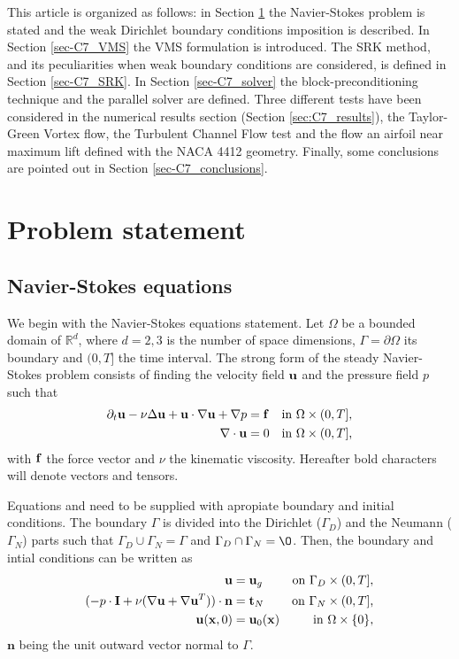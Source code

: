 This article is organized as follows: in Section \ref{sec:C7_prob_statment} the Navier-Stokes problem is stated and the weak Dirichlet boundary conditions imposition is described. In Section \ref{sec-C7_VMS} the VMS formulation is introduced. The SRK method, and its peculiarities when weak boundary conditions are considered, is defined in Section \ref{sec-C7_SRK}. In Section \ref{sec-C7_solver} the block-preconditioning technique and the parallel solver are defined. Three different tests have been considered in the numerical results section (Section \ref{sec:C7_results}), the Taylor-Green Vortex flow, the Turbulent Channel Flow test and the flow an airfoil near maximum lift defined with the NACA 4412 geometry. Finally, some conclusions are pointed out in Section \ref{sec-C7_conclusions}.

\section{Problem statement}
\label{sec:C7_prob_statment}
\subsection{Navier-Stokes equations}
\label{subsec:C7_NS_eq}
We begin with the Navier-Stokes equations statement. Let $\Omega$ be a bounded domain of $\mathbb{R}^d$, where $d=2,3$ is the number of space dimensions, $\Gamma=\partial\Omega$ its boundary and $(0,T]$ the time interval. The strong form of the steady Navier-Stokes problem consists of finding the velocity field ${\bf u}$ and the pressure field $p$ such that 
\begin{align}
\label{eq-C7_NS_strong_mome}
\partial_t{\bf u}-\nu\Delta{\bf u}+{\bf u}\cdot\nabla{\bf u}+\nabla p&={\bf f}&\mbox{in $\Omega\times(0,T]$,}\\
\label{eq-C7_NS_strong_inc}
\nabla\cdot{\bf u}&=0&\mbox{in $\Omega\times(0,T]$,}
\end{align}
with ${\bf f}$ the force vector and $\nu$ the kinematic viscosity. Hereafter bold characters will denote vectors and tensors.

Equations  and  need to be supplied with apropiate boundary and initial conditions. The boundary $\Gamma$ is divided into the Dirichlet ($\Gamma_D$) and the Neumann ($\Gamma_N$) parts such that $\Gamma_D\cup\Gamma_N=\Gamma$ and $\Gamma_D\cap\Gamma_N=\O$. Then, the boundary and intial conditions can be written as
\begin{align}
\label{eq-C7_NS_strong_Dir}
{\bf u}&={\bf u}_g&\mbox{on $\Gamma_D\times(0,T]$,}\\
\label{eq-C7_NS_strong_Neu}
(-p\cdot\mathbf{I}+\nu(\nabla{\bf u}+\nabla{\bf u}^T))\cdot\mathbf{n}&=\mathbf{t}_N&\mbox{on $\Gamma_N\times(0,T]$,}\\
\label{eq-C7_NS_strong_Ini}
{\bf u}({\bf x},0)&={\bf u}_0({\bf x})&\mbox{in $\Omega\times\{0\}$,}
\end{align}
$\mathbf{n}$ being the unit outward vector normal to $\Gamma$.

